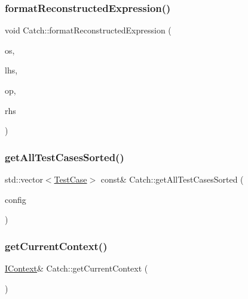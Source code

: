 \mbox{\label{namespace_catch_a520110c31f26cf9892595772ab814fc0}} 
\subsubsection{\texorpdfstring{format\+Reconstructed\+Expression()}{formatReconstructedExpression()}}
{\footnotesize\ttfamily void Catch\+::format\+Reconstructed\+Expression (\begin{DoxyParamCaption}\item[{std\+::ostream \&}]{os,  }\item[{std\+::string const \&}]{lhs,  }\item[{\mbox{\hyperlink{class_catch_1_1_string_ref}{String\+Ref}}}]{op,  }\item[{std\+::string const \&}]{rhs }\end{DoxyParamCaption})}

\mbox{\label{namespace_catch_a1c9b1a23bc947ea70ddaabf067276cf2}} 
\subsubsection{\texorpdfstring{get\+All\+Test\+Cases\+Sorted()}{getAllTestCasesSorted()}}
{\footnotesize\ttfamily std\+::vector$<$\mbox{\hyperlink{class_catch_1_1_test_case}{Test\+Case}}$>$ const\& Catch\+::get\+All\+Test\+Cases\+Sorted (\begin{DoxyParamCaption}\item[{\mbox{\hyperlink{struct_catch_1_1_i_config}{I\+Config}} const \&}]{config }\end{DoxyParamCaption})}

\mbox{\label{namespace_catch_ad517cca9b21deb79101e90e5508dd161}} 
\subsubsection{\texorpdfstring{get\+Current\+Context()}{getCurrentContext()}}
{\footnotesize\ttfamily \mbox{\hyperlink{struct_catch_1_1_i_context}{I\+Context}}\& Catch\+::get\+Current\+Context (\begin{DoxyParamCaption}{ }\end{DoxyParamCaption})\hspace{0.3cm}{\ttfamily [inline]}}

